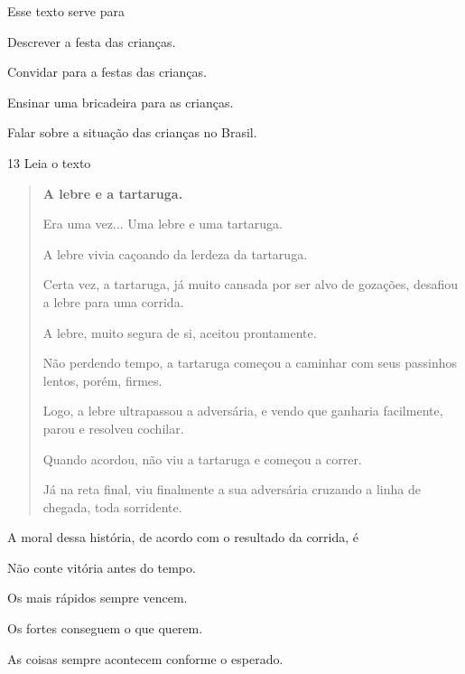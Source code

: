 Esse texto serve para

\begin{escolha}
\item Descrever a festa das crianças.

\item Convidar para a festas das crianças.

\item Ensinar uma bricadeira para as crianças.

\item Falar sobre a situação das crianças no Brasil.
\end{escolha}


\num{13} Leia o texto

\begin{quote}
\textbf{A lebre e a tartaruga.}

Era uma vez... Uma lebre e uma tartaruga.

A lebre vivia caçoando da lerdeza da tartaruga.

Certa vez, a tartaruga, já muito cansada por ser alvo de gozações,
desafiou a lebre para uma corrida.

A lebre, muito segura de si, aceitou prontamente.

Não perdendo tempo, a tartaruga começou a caminhar com seus passinhos
lentos, porém, firmes.

Logo, a lebre ultrapassou a adversária, e vendo que ganharia facilmente, parou
e resolveu cochilar.

Quando acordou, não viu a tartaruga e começou a correr.

Já na reta final, viu finalmente a sua adversária cruzando a linha de
chegada, toda sorridente.
\end{quote}


A moral dessa história, de acordo com o resultado da corrida, é

\begin{escolha}
\item Não conte vitória antes do tempo.

\item Os mais rápidos sempre vencem.

\item Os fortes conseguem o que querem.

\item As coisas sempre acontecem conforme o esperado.
\end{escolha}



